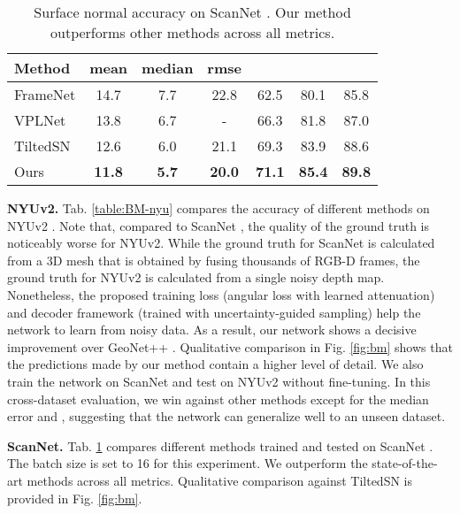 \documentclass[10pt,twocolumn,letterpaper]{article}
\begin{document}
\begin{table}[t]
\setlength\tabcolsep{1.5pt}
\begin{center}
\begin{tabular}{l|ccc|ccc}
\toprule
Method  & mean & median & rmse &  &  &  \\
\midrule
FrameNet\cite{SNfromRGB_19_FrameNet} & 14.7 & 7.7 & 22.8 & 62.5 & 80.1 & 85.8 \\
VPLNet\cite{SNfromRGB_20_VPLNet} & 13.8 & 6.7 & - & 66.3 & 81.8 & 87.0 \\
TiltedSN\cite{SNfromRGB_20_TiltedSN} & 12.6 & 6.0 & 21.1 & 69.3 & 83.9 & 88.6 \\
\hline
Ours & \textbf{11.8} & \textbf{5.7} & \textbf{20.0} & \textbf{71.1} & \textbf{85.4} & \textbf{89.8} \\
\bottomrule
\end{tabular}
\end{center}
\caption{Surface normal accuracy on ScanNet \cite{ScanNet}. Our method outperforms other methods across all metrics.}
\label{table:BM-scannet}
\end{table}

\noindent
\textbf{NYUv2.} Tab. \ref{table:BM-nyu} compares the accuracy of different methods on NYUv2 \cite{NYUv2}. Note that, compared to ScanNet \cite{ScanNet}, the quality of the ground truth is noticeably worse for NYUv2. While the ground truth for ScanNet is calculated from a 3D mesh that is obtained by fusing thousands of RGB-D frames, the ground truth for NYUv2 is calculated from a single noisy depth map. Nonetheless, the proposed training loss (angular loss with learned attenuation) and decoder framework (trained with uncertainty-guided sampling) help the network to learn from noisy data. As a result, our network shows a decisive improvement over GeoNet++ \cite{SNfromRGB_20_GeoNet++}. Qualitative comparison in Fig. \ref{fig:bm} shows that the predictions made by our method contain a higher level of detail. We also train the network on ScanNet and test on NYUv2 without fine-tuning. In this cross-dataset evaluation, we win against other methods except for the median error and , suggesting that the network can generalize well to an unseen dataset.

\noindent
\textbf{ScanNet.} Tab. \ref{table:BM-scannet} compares different methods trained and tested on ScanNet \cite{ScanNet}. The batch size is set to 16 for this experiment. We outperform the state-of-the-art methods across all metrics. Qualitative comparison against TiltedSN \cite{SNfromRGB_20_TiltedSN} is provided in Fig. \ref{fig:bm}.
\end{document}
